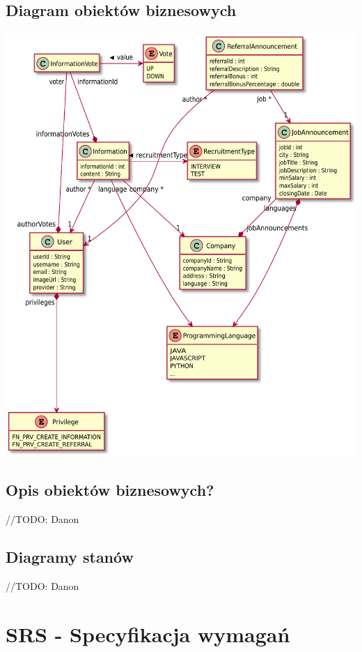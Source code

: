 \documentclass[oneside]{scrreprt}
\begin{document}
\section{Diagram obiektów biznesowych}
\includegraphics[width=\textwidth, keepaspectratio]{graphics/hydra_business_class_diagram.pdf}

\section{Opis obiektów biznesowych?}
//TODO: Danon

\section{Diagramy stanów}
//TODO: Danon

\chapter{SRS - Specyfikacja wymagań}
\end{document}
